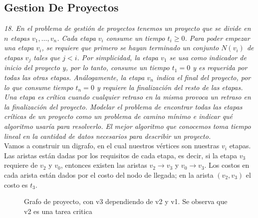 \documentclass{article}
\begin{document}
\subsection*{Gestion De Proyectos}
\textit{18. En el problema de gestión de proyectos tenemos un proyecto que se divide en $n$ etapas $v_1, \ldots, v_n$. Cada etapa $v_i$ consume un tiempo $t_i \geq 0$. Para poder empezar una etapa $v_i$, se requiere que primero se hayan terminado un conjunto $N(v_i)$ de etapas $v_j$ tales que $j < i$. Por simplicidad, la etapa $v_1$ se usa como indicador de inicio del proyecto y, por lo tanto, consume un tiempo $t_1 = 0$ y es requerida por todas las otras etapas. Análogamente, la etapa $v_n$ indica el final del proyecto, por lo que consume tiempo $t_n = 0$ y requiere la finalización del resto de las etapas. Una etapa es crítica cuando cualquier retraso en la misma provoca un retraso en la finalización del proyecto. Modelar el problema de encontrar todas las etapas críticas de un proyecto como un problema de camino mínimo e indicar qué algoritmo usaría para resolverlo. El mejor algoritmo que conocemos toma tiempo lineal en la cantidad de datos necesarios para describir un proyecto.} \\

Vamos a construir un digrafo, en el cual nuestros vértices son nuestras $v_i$ etapas. Las aristas están dadas por los requisitos de cada etapa, es decir, si la etapa $v_3$ requiere de $v_2$ y $v_0$, entonces existen las aristas $v_2 \to v_3$ y $v_0 \to v_3$. Los costos en cada arista están dados por el costo del nodo de llegada; en la arista $(v_2, v_3)$ el costo es $t_3$.


\begin{figure}[h]


\caption{Grafo de proyecto, con v3 dependiendo de v2 y v1. Se observa que  v2 es una tarea critica}
\end{figure}
\end{document}
